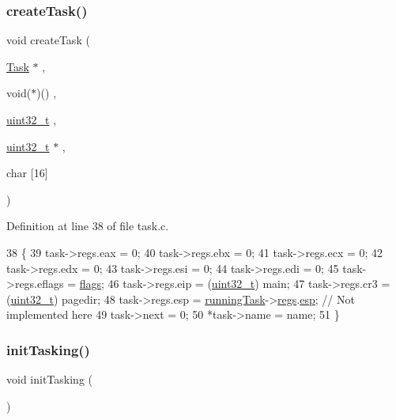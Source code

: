 \subsubsection{\texorpdfstring{create\+Task()}{createTask()}}
{\footnotesize\ttfamily void create\+Task (\begin{DoxyParamCaption}\item[{\hyperlink{a00134}{Task} $\ast$}]{,  }\item[{void($\ast$)()}]{,  }\item[{\hyperlink{a00092_a435d1572bf3f880d55459d9805097f62_a435d1572bf3f880d55459d9805097f62}{uint32\+\_\+t}}]{,  }\item[{\hyperlink{a00092_a435d1572bf3f880d55459d9805097f62_a435d1572bf3f880d55459d9805097f62}{uint32\+\_\+t} $\ast$}]{,  }\item[{char}]{\mbox{[}16\mbox{]} }\end{DoxyParamCaption})}



Definition at line 38 of file task.\+c.


\begin{DoxyCode}
38                                                                                               \{
39     task->regs.eax = 0;
40     task->regs.ebx = 0;
41     task->regs.ecx = 0;
42     task->regs.edx = 0;
43     task->regs.esi = 0;
44     task->regs.edi = 0;
45     task->regs.eflags = \hyperlink{a00065_aa2585d779da0ab21273a8d92de9a0ebe_aa2585d779da0ab21273a8d92de9a0ebe}{flags};
46     task->regs.eip = (\hyperlink{a00092_a435d1572bf3f880d55459d9805097f62_a435d1572bf3f880d55459d9805097f62}{uint32\_t}) main;
47     task->regs.cr3 = (\hyperlink{a00092_a435d1572bf3f880d55459d9805097f62_a435d1572bf3f880d55459d9805097f62}{uint32\_t}) pagedir;
48     task->regs.esp = \hyperlink{a00044_a2c195d425b4a6791b3a89f7b219f93d9_a2c195d425b4a6791b3a89f7b219f93d9}{runningTask}->\hyperlink{a00134_a136b243ee52ff89e9ba97f4e4dba19bb_a136b243ee52ff89e9ba97f4e4dba19bb}{regs}.\hyperlink{a00130_aca352215ac1e37f833da4f6289392261_aca352215ac1e37f833da4f6289392261}{esp}; \textcolor{comment}{// Not implemented here}
49     task->next = 0;
50     *task->name = name;
51 \}
\end{DoxyCode}
\mbox{\label{a00047_aea945e91746a54801f4763ad264746b9_aea945e91746a54801f4763ad264746b9}} 
\subsubsection{\texorpdfstring{init\+Tasking()}{initTasking()}}
{\footnotesize\ttfamily void init\+Tasking (\begin{DoxyParamCaption}{ }\end{DoxyParamCaption})}



